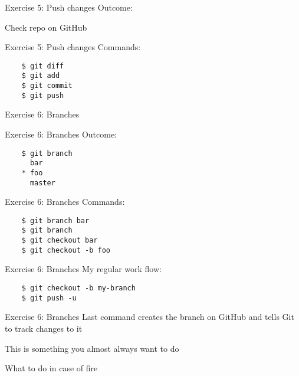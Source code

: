 \documentclass{beamer}
\begin{document}
\begin{frame}{Exercise 5: Push changes}
  Outcome:

  Check repo on GitHub
\end{frame}

\begin{frame}[fragile]{Exercise 5: Push changes}
  Commands:

  \begin{verbatim}
    $ git diff
    $ git add
    $ git commit
    $ git push
  \end{verbatim}
\end{frame}

\begin{frame}{}
  \center
  \Huge Exercise 6: Branches
\end{frame}

\begin{frame}[fragile]{Exercise 6: Branches}
  Outcome:

  \begin{verbatim}
    $ git branch
      bar
    * foo
      master
  \end{verbatim}
\end{frame}

\begin{frame}[fragile]{Exercise 6: Branches}
  Commands:

  \begin{verbatim}
    $ git branch bar
    $ git branch
    $ git checkout bar
    $ git checkout -b foo
  \end{verbatim}
\end{frame}

\begin{frame}[fragile]{Exercise 6: Branches}
  My regular work flow:

  \begin{verbatim}
    $ git checkout -b my-branch
    $ git push -u
  \end{verbatim}
\end{frame}

\begin{frame}{Exercise 6: Branches}
  \center
  \Large
  Last command creates the branch on GitHub and tells Git to track changes to it
  \pause

  This is something you almost always want to do

\end{frame}

\begin{frame}{}
  \center
  \Huge What to do in case of fire
\end{frame}
\end{document}
